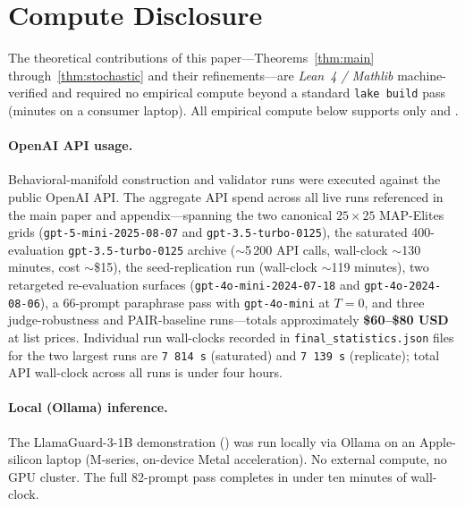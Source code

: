 
\section*{Compute Disclosure}
\label{sec:compute}

The theoretical contributions of this paper---Theorems~\ref{thm:main}
through~\ref{thm:stochastic} and their refinements---are
\emph{Lean~4 / Mathlib} machine-verified and required no empirical
compute beyond a standard \texttt{lake build} pass (minutes on a
consumer laptop). All empirical compute below supports only
 and .

\paragraph{OpenAI API usage.}
Behavioral-manifold construction and validator runs were executed
against the public OpenAI API. The aggregate API spend across all live
runs referenced in the main paper and appendix---spanning the two
canonical $25\times25$ MAP-Elites grids
(\texttt{gpt-5-mini-2025-08-07} and \texttt{gpt-3.5-turbo-0125}), the
saturated 400-evaluation \texttt{gpt-3.5-turbo-0125} archive
($\sim$5\,200 API calls, wall-clock $\sim$130 minutes, cost
$\sim$\$15), the seed-replication run (wall-clock $\sim$119 minutes),
two retargeted re-evaluation surfaces
(\texttt{gpt-4o-mini-2024-07-18} and \texttt{gpt-4o-2024-08-06}), a
66-prompt paraphrase pass with \texttt{gpt-4o-mini} at $T\!=\!0$, and
three judge-robustness and PAIR-baseline runs---totals approximately
\textbf{\$60--\$80 USD} at list prices. Individual run wall-clocks
recorded in \texttt{final\_statistics.json} files for the two largest
runs are \texttt{7\,814\,s} (saturated) and \texttt{7\,139\,s}
(replicate); total API wall-clock across all runs is under four
hours.

\paragraph{Local (Ollama) inference.}
The LlamaGuard-3-1B demonstration () was run
locally via Ollama on an Apple-silicon laptop (M-series, on-device
Metal acceleration). No external compute, no GPU cluster. The full
82-prompt pass completes in under ten minutes of wall-clock.

